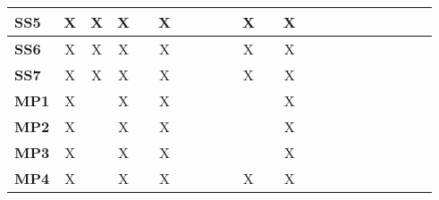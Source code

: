 \documentclass[12pt]{article}
\begin{document}
\begin{table}[H]
\begin{adjustwidth}{-0.8in}{-1.2in}
{\begin{tabular}{c|c|c|c|c|c|c|c|c|c|c|c|c|c|c|c|c|c|c|c|c|c}
\multicolumn{1}{|l|}{\textbf{SS5}}   &      X       &       X      &      X       &              &      X       &              &              &              &              &      X       &              &      X       &              &              &             &              &             &             &             &             \\ \hline
\multicolumn{1}{|l|}{\textbf{SS6}}   &      X       &       X      &      X       &              &      X       &              &              &              &              &      X       &              &      X       &              &              &             &              &             &             &             &             \\ \hline
\multicolumn{1}{|l|}{\textbf{SS7}}   &      X       &       X      &      X       &              &      X       &              &              &              &              &      X       &              &      X       &              &              &             &              &             &             &             &             \\ \hline
\multicolumn{1}{|l|}{\textbf{MP1}}   &      X       &              &      X       &              &      X       &              &              &              &              &              &              &      X       &              &              &             &              &             &             &             &             \\ \hline
\multicolumn{1}{|l|}{\textbf{MP2}}   &      X       &              &      X       &              &      X       &              &              &              &              &              &              &      X       &              &              &             &              &             &             &             &             \\ \hline
\multicolumn{1}{|l|}{\textbf{MP3}}   &      X       &              &      X       &              &      X       &              &              &              &              &              &              &      X       &              &              &             &              &             &             &             &             \\ \hline
\multicolumn{1}{|l|}{\textbf{MP4}}   &      X       &              &      X       &              &      X       &              &              &              &              &      X       &              &      X       &              &              &             &              &             &             &             &             \\ \hline

\end{tabular}}
\end{adjustwidth}
\end{table}
\end{document}
